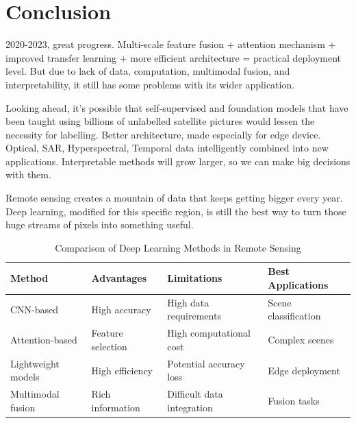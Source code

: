 \documentclass[12pt,a4paper]{article}
\begin{document}
\section{Conclusion}
\label{sec:conclusion}
2020-2023, great progress. Multi-scale feature fusion + attention mechanism + improved transfer learning + more efficient architecture = practical deployment level. But due to lack of data, computation, multimodal fusion, and interpretability, it still has some problems with its wider application.

Looking ahead, it’s possible that self-supervised and foundation models that have been taught using billions of unlabelled satellite pictures would lessen the necessity for labelling. Better architecture, made especially for edge device. Optical, SAR, Hyperspectral, Temporal data intelligently combined into new applications. Interpretable methods will grow larger, so we can make big decisions with them.

Remote sensing creates a mountain of data that keeps getting bigger every year. Deep learning, modified for this specific region, is still the best way to turn those huge streams of pixels into something useful.

\begin{table}[htbp]
\centering
\caption{Comparison of Deep Learning Methods in Remote Sensing}
\label{tab:comparison}
\begin{tabular}{@{}llll@{}}
\toprule
\textbf{Method} & \textbf{Advantages} & \textbf{Limitations} & \textbf{Best Applications} \\
\midrule
CNN-based & High accuracy & High data requirements & Scene classification \\
Attention-based & Feature selection & High computational cost & Complex scenes \\
Lightweight models & High efficiency & Potential accuracy loss & Edge deployment \\
Multimodal fusion & Rich information & Difficult data integration & Fusion tasks \\
\bottomrule
\end{tabular}
\end{table}
\end{document}
